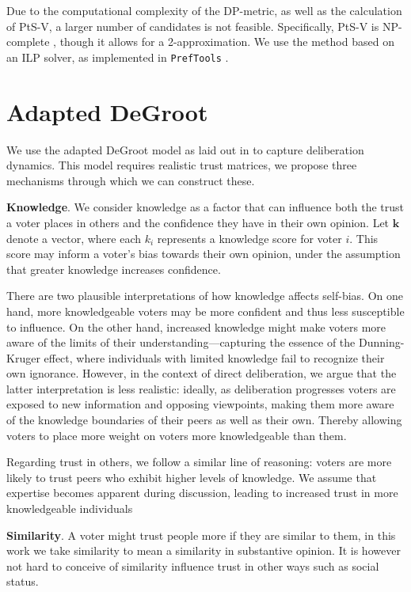 Due to the computational complexity of the
DP-metric, as well as the calculation of PtS-V, a larger number of candidates is not
feasible. Specifically, PtS-V is NP-complete
\cite{erdelyiComputationalAspectsNearly2013}, though it allows for a
2-approximation. We use the method based on an ILP solver, as implemented in
\texttt{PrefTools} \cite{PrefLibPreflibtools2025}.



\section{Adapted DeGroot}
We use the adapted DeGroot model as laid out in  to capture deliberation dynamics. This model requires realistic trust matrices, we propose three mechanisms through which we can construct these.


\textbf{Knowledge}. We consider knowledge as a factor that can influence both the trust a voter places in others and the confidence they have in their own opinion. Let $\boldsymbol{k}$ denote a vector, where each $k_i$ represents a knowledge score for voter $i$. This score may inform a voter's bias towards their own opinion, under the assumption that greater knowledge increases confidence.

There are two plausible interpretations of how knowledge affects self-bias. On
one hand, more knowledgeable voters may be more confident and thus less
susceptible to influence. On the other hand, increased knowledge might make
voters more aware of the limits of their understanding—capturing the essence of
the Dunning-Kruger effect, where individuals with limited knowledge fail to
recognize their own ignorance. However, in the context of direct deliberation,
we argue that the latter interpretation is less realistic: ideally, as
deliberation progresses voters are exposed to new information and opposing
viewpoints, making them more aware of the knowledge boundaries of their peers
as well as their own. Thereby allowing voters to place more weight on voters
more knowledgeable than them.

Regarding trust in others, we follow a similar line of reasoning: voters are
more likely to trust peers who exhibit higher levels of knowledge. We assume
that expertise becomes apparent during discussion, leading to increased
trust in more knowledgeable individuals


\textbf{Similarity}. A voter might trust people more if they are similar to them, in this work we take similarity to mean a similarity in substantive opinion. It is however not hard to conceive of similarity influence trust in other ways such as social status.


